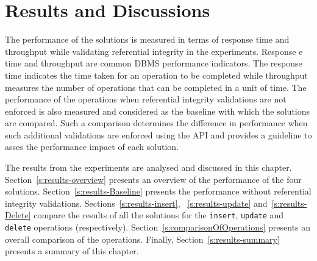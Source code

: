 \chapter{Results and Discussions}
 

The performance of the solutions is measured in terms of response time and
throughput while validating referential integrity in the experiments.  Response e
time and throughput are common \ac{DBMS} performance indicators.  The response
time  indicates the time taken for an operation to be completed  while
throughput measures the number of operations that can be  completed in a unit of
time. 
The performance of the operations when referential integrity validations are not
enforced is also measured and considered as the baseline with which the
solutions are compared.   Such a comparison determines the difference in
performance  when such additional validations are enforced using the \ac{API}
and provides a guideline to asses the performance impact of each solution. 

The results from the experiments are analysed and discussed in this chapter. 
Section~\ref{s:results-overview} presents an overview of the  performance of the
four solutions.  
Section~\ref{s:results-Baseline} presents the performance without referential
integrity validations.  
Sections~\ref{s:results-insert},  ~\ref{s:results-update}
and~\ref{s:results-Delete} compare the results
of all the solutions for the \texttt{insert},   \texttt{update} and
\texttt{delete} operations (respectively).   
Section~\ref{s:comparisonOfOperations} presents an overall comparison of the
operations.  
 Finally,   Section~\ref{s:results-summary} presents a summary of this chapter.  

\newcommand{\Width}{0.5\textwidth}
\newcommand{\TB}[1]{\textbf{#1}} 




 




